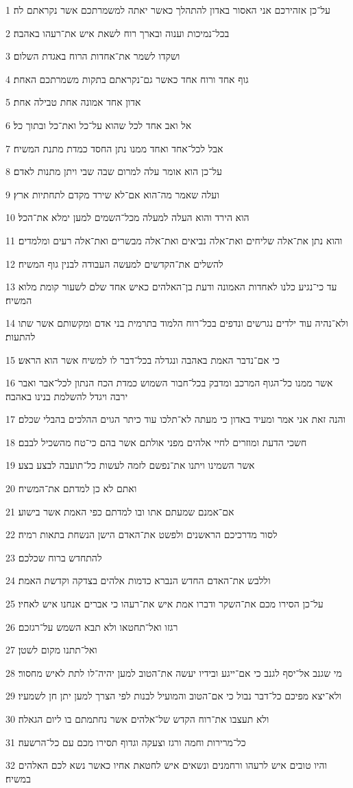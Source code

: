 \par 1 על־כן אזהירכם אני האסור באדון להתהלך כאשר יאתה למשמרתכם אשר נקראתם לה׃
\par 2 בכל־נמיכות וענוה ובארך רוח לשאת איש את־רעהו באהבה׃
\par 3 ושקדו לשמר את־אחדות הרוח באגדת השלום׃
\par 4 גוף אחד ורוח אחד כאשר גם־נקראתם בתקות משמרתכם האחת׃
\par 5 אדון אחד אמונה אחת טבילה אחת׃
\par 6 אל ואב אחד לכל שהוא על־כל ואת־כל ובתוך כל׃
\par 7 אבל לכל־אחד ואחד ממנו נתן החסד כמדת מתנת המשיח׃
\par 8 על־כן הוא אומר עלה למרום שבה שבי ויתן מתנות לאדם׃
\par 9 ועלה שאמר מה־הוא אם־לא שירד מקדם לתחתיות ארץ׃
\par 10 הוא הירד והוא העלה למעלה מכל־השמים למען ימלא את־הכל׃
\par 11 והוא נתן את־אלה שליחים ואת־אלה נביאים ואת־אלה מבשרים ואת־אלה רעים ומלמדים׃
\par 12 להשלים את־הקדשים למעשה העבודה לבנין גוף המשיח׃
\par 13 עד כי־נגיע כלנו לאחדות האמונה ודעת בן־האלהים כאיש אחד שלם לשעור קומת מלוא המשיח׃
\par 14 ולא־נהיה עוד ילדים נגרשים ונדפים בכל־רוח הלמוד בתרמית בני אדם ומקשותם אשר שתו להתעות׃
\par 15 כי אם־נדבר האמת באהבה ונגדלה בכל־דבר לו למשיח אשר הוא הראש׃
\par 16 אשר ממנו כל־הגוף המרכב ומדבק בכל־חבור השמוש כמדת הכח הנתון לכל־אבר ואבר ירבה ויגדל להשלמת בנינו באהבה׃
\par 17 והנה זאת אני אמר ומעיד באדון כי מעתה לא־תלכו עוד כיתר הגוים ההלכים בהבלי שכלם׃
\par 18 חשכי הדעת ומוזרים לחיי אלהים מפני אולתם אשר בהם כי־טח מהשכיל לבבם׃
\par 19 אשר השמינו ויתנו את־נפשם לזמה לעשות כל־תועבה לבצע בצע׃
\par 20 ואתם לא כן למדתם את־המשיח׃
\par 21 אם־אמנם שמעתם אתו ובו למדתם כפי האמת אשר בישוע׃
\par 22 לסור מדרכיכם הראשנים ולפשט את־האדם הישן הנשחת בתאות רמיה׃
\par 23 להתחדש ברוח שכלכם׃
\par 24 וללבש את־האדם החדש הנברא כדמות אלהים בצדקה וקדשת האמת׃
\par 25 על־כן הסירו מכם את־השקר ודברו אמת איש את־רעהו כי אברים אנחנו איש לאחיו׃
\par 26 רגזו ואל־תחטאו ולא תבא השמש על־רגזכם׃
\par 27 ואל־תתנו מקום לשטן׃
\par 28 מי שגנב אל־יסף לגנב כי אם־ייגע ובידיו יעשה את־הטוב למען יהיה־לו לתת לאיש מחסור׃
\par 29 ולא־יצא מפיכם כל־דבר נבול כי אם־הטוב והמועיל לבנות לפי הצרך למען יתן חן לשמעיו׃
\par 30 ולא תעצבו את־רוח הקדש של־אלהים אשר נחתמתם בו ליום הגאלה׃
\par 31 כל־מרירות וחמה ורגז וצעקה וגדוף תסירו מכם עם כל־הרשעה׃
\par 32 והיו טובים איש לרעהו ורחמנים ונשאים איש לחטאת אחיו כאשר נשא לכם האלהים במשיח׃

